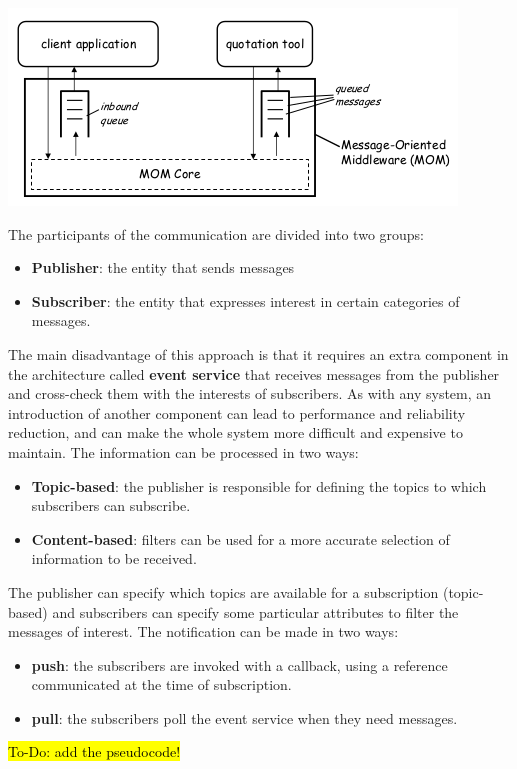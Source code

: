 \begin{center}
    \includegraphics[scale=0.55]{images/MOM_schema.png}
\end{center}
The participants of the communication are divided into two groups:
\begin{itemize}
    \item \textbf{Publisher}: the entity that sends messages
    \item \textbf{Subscriber}: the entity that expresses interest in certain categories of messages.
\end{itemize}
The main disadvantage of this approach is that it requires an extra component in the architecture called \textbf{event service} that receives messages from the publisher and cross-check them with the interests of subscribers.
As with any system, an introduction of another component can lead to performance and reliability reduction, and can make the whole system more difficult and expensive to maintain.
The information can be processed in two ways:
\begin{itemize}
    \item \textbf{Topic-based}: the publisher is responsible for defining the topics to which subscribers can subscribe.
    \item \textbf{Content-based}: filters can be used for a more accurate selection of information to be received.
\end{itemize}
The publisher can specify which topics are available for a subscription (topic-based) and subscribers can specify some particular attributes to filter the messages of interest.
The notification can be made in two ways:
\begin{itemize}
    \item \textbf{push}: the subscribers are invoked with a callback, using a reference communicated at the time of subscription.
    \item \textbf{pull}: the subscribers poll the event service when they need messages.
\end{itemize}
\hl{To-Do: add the pseudocode!}
